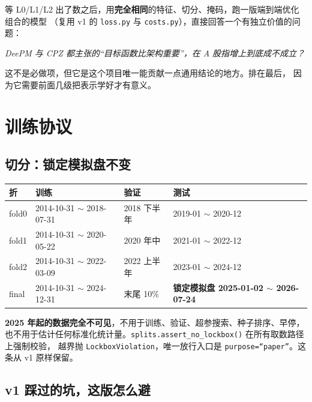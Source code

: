 \documentclass[11pt, a4paper]{ctexart}
\newcommand{\file}[1]{\texttt{\small #1}}
\begin{document}
等 L0/L1/L2 出了数之后，用\textbf{完全相同}的特征、切分、掩码，跑一版端到端优化组合的模型
（复用 v1 的 \file{loss.py} 与 \file{costs.py}），直接回答一个有独立价值的问题：

\begin{center}
\emph{DeePM 与 CPZ 都主张的“目标函数比架构重要”，在 A 股指增上到底成不成立？}
\end{center}

这不是必做项，但它是这个项目唯一能贡献一点通用结论的地方。排在最后，
因为它需要前面几级把表示学好才有意义。

\section{训练协议}

\subsection{切分：锁定模拟盘不变}

\begin{center}
\small
\begin{tabular}{llll}
\toprule
折 & 训练 & 验证 & 测试 \\
\midrule
fold0 & 2014-10-31 $\sim$ 2018-07-31 & 2018 下半年 & 2019-01 $\sim$ 2020-12 \\
fold1 & 2014-10-31 $\sim$ 2020-05-22 & 2020 年中 & 2021-01 $\sim$ 2022-12 \\
fold2 & 2014-10-31 $\sim$ 2022-03-09 & 2022 上半年 & 2023-01 $\sim$ 2024-12 \\
\midrule
final & 2014-10-31 $\sim$ 2024-12-31 & 末尾 10\% & \textbf{锁定模拟盘 2025-01-02 $\sim$ 2026-07-24} \\
\bottomrule
\end{tabular}
\end{center}

\begin{okbox}
\textbf{2025 年起的数据完全不可见}，不用于训练、验证、超参搜索、种子排序、早停，
也不用于估计任何标准化统计量。\file{splits.assert\_no\_lockbox()} 在所有取数路径上强制校验，
越界抛 \file{LockboxViolation}，唯一放行入口是 \file{purpose=“paper”}。这条从 v1 原样保留。
\end{okbox}

\subsection{v1 踩过的坑，这版怎么避}
\end{document}
